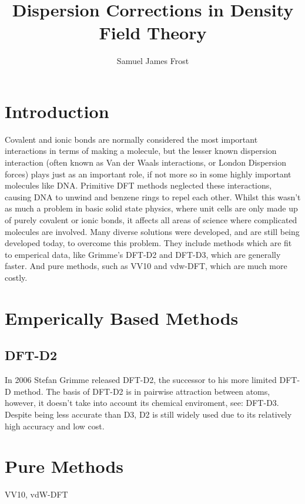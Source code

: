 \documentclass[10pt,a4paper,twocolumn,twoside]{extarticle}
\title{Dispersion Corrections in Density Field Theory}
\author{Samuel James Frost}
\begin{document}
	\thispagestyle{empty}
	\twocolumn[
	\begin{@twocolumnfalse}
		\begin{center}
			\vspace*{-10mm}
			{\Large\scshape\papertitle}\\
			\vspace{2ex}
			{\itshape\paperauthor}
		\end{center}
		\centering\noindent\rule{0.9\textwidth}{0.4pt}
		\begin{abstract}
			{\lipsum[5]}
		\end{abstract}
		\centering\noindent\rule{0.9\textwidth}{0.4pt}\\
		\vspace{1cm}
	\end{@twocolumnfalse}]
	\tableofcontents

	
	\section{Introduction}
	Covalent and ionic bonds are normally considered the most important interactions in terms of making a molecule, but the lesser known dispersion interaction (often known as Van der Waals interactions, or London Dispersion forces) plays just as an important role, if not more so in some highly important molecules like DNA.
	Primitive DFT methods neglected these interactions, causing DNA to unwind and benzene rings to repel each other. Whilst this wasn't as much a problem in basic solid state physics, where unit cells are only made up of purely covalent or ionic bonds, it affects all areas of science where complicated molecules are involved. 
	Many diverse solutions were developed, and are still being developed today, to overcome this problem. They include methods which are fit to emperical data, like Grimme's DFT-D2 and DFT-D3, which are generally faster. And pure methods, such as VV10 and vdw-DFT, which are much more costly.


	\section{Emperically Based Methods}
	\subsection{DFT-D2}
	In 2006 Stefan Grimme released DFT-D2\cite{Grimme2006}, 
	the successor to his more limited DFT-D method.
	The basis of DFT-D2 is in pairwise attraction between atoms, however, it doesn't take into account its chemical enviroment, see: DFT-D3. Despite being less accurate than D3, D2 is still widely used due to its relatively high accuracy and low cost.


	\section{Pure Methods}
	VV10, vdW-DFT

	\newpage
	\printbibliography
\end{document}
